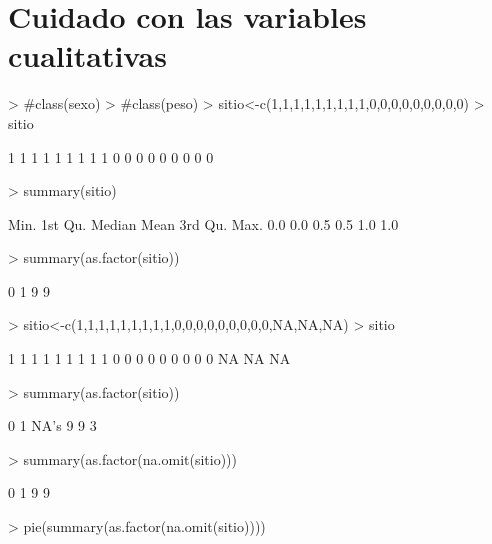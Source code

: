 \documentclass[12pt]{article}
\begin{document}
  \section*{Cuidado con las variables cualitativas}
\begin{Schunk}
\begin{Sinput}
> #class(sexo)
> #class(peso)
> sitio<-c(1,1,1,1,1,1,1,1,1,0,0,0,0,0,0,0,0,0)
> sitio
\end{Sinput}
\begin{Soutput}
 [1] 1 1 1 1 1 1 1 1 1 0 0 0 0 0 0 0 0 0
\end{Soutput}
\begin{Sinput}
> summary(sitio)
\end{Sinput}
\begin{Soutput}
   Min. 1st Qu.  Median    Mean 3rd Qu.    Max. 
    0.0     0.0     0.5     0.5     1.0     1.0 
\end{Soutput}
\begin{Sinput}
> summary(as.factor(sitio))
\end{Sinput}
\begin{Soutput}
0 1 
9 9 
\end{Soutput}
\begin{Sinput}
> sitio<-c(1,1,1,1,1,1,1,1,1,0,0,0,0,0,0,0,0,0,NA,NA,NA)
> sitio
\end{Sinput}
\begin{Soutput}
 [1]  1  1  1  1  1  1  1  1  1  0  0  0  0  0  0  0  0  0 NA NA NA
\end{Soutput}
\begin{Sinput}
> summary(as.factor(sitio))
\end{Sinput}
\begin{Soutput}
   0    1 NA's 
   9    9    3 
\end{Soutput}
\begin{Sinput}
> summary(as.factor(na.omit(sitio)))
\end{Sinput}
\begin{Soutput}
0 1 
9 9 
\end{Soutput}
\end{Schunk}
\begin{Schunk}
\begin{Sinput}
> pie(summary(as.factor(na.omit(sitio))))
\end{Sinput}
\end{Schunk}
\end{document}
